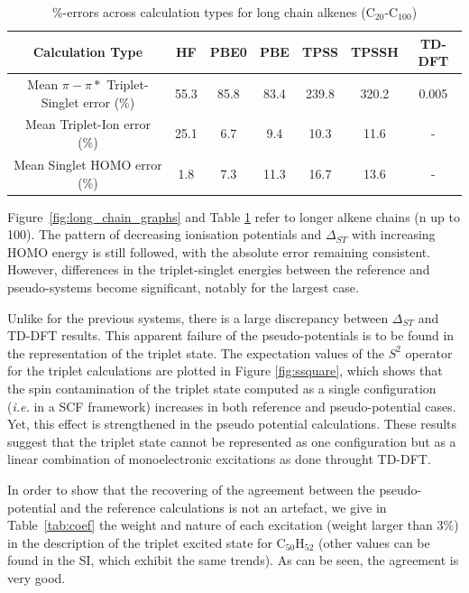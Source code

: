 \documentclass[journal=jctcce,manuscript=article]{achemso}
\begin{document}
\begin{table}[h]
\caption{\%-errors across calculation types for long chain alkenes (C\(_{20}\)-C\(_{100}\))}
\begin{tabular}{c c c c c c c}
\hline\hline
Calculation Type & HF & PBE0 & PBE & TPSS & TPSSH & TD-DFT \\
\hline
Mean \(\pi - \pi*\) Triplet-Singlet error (\%) & 55.3 & 85.8 & 83.4 & 239.8 & 320.2 & 0.005 \\
Mean Triplet-Ion error (\%) & 25.1 & 6.7 & 9.4 & 10.3 & 11.6 & - \\
Mean Singlet HOMO error (\%) & 1.8 & 7.3 & 11.3 & 16.7 & 13.6 & - \\
\hline
\end{tabular}
\label{table:long_alkene_errors}
\end{table}

Figure~\ref{fig:long_chain_graphs} and Table \ref{table:long_alkene_errors} refer to longer 
alkene chains (n up to 100).
The pattern of decreasing ionisation potentials and $\Delta_{ST}$ with increasing HOMO
energy is still followed, with the absolute error remaining consistent.
However, differences in the triplet-singlet energies between the reference and pseudo-systems 
become significant, notably for the largest case.

Unlike for the previous systems, there is a large discrepancy between $\Delta_{ST}$
and TD-DFT results.
This apparent failure of the pseudo-potentials is to be found in the representation
of the triplet state. The expectation values of the $S^2$ operator for the triplet calculations
are plotted in Figure \ref{fig:ssquare}, which shows that the spin contamination
of the triplet state computed as a single configuration (\emph{i.e.} in a SCF
framework) increases in both reference and pseudo-potential cases.
Yet, this effect is strengthened in the pseudo potential calculations.
These results suggest that the triplet state cannot be represented as one configuration
but as a linear combination of monoelectronic excitations as done throught TD-DFT.

In order to show that the recovering of the agreement between the pseudo-potential
and the reference calculations is not an artefact, we give in Table~\ref{tab:coef}
the weight and nature of each excitation (weight larger than 3\%)
in the description of the triplet excited state for
C$_{50}$H$_{52}$ (other values can be found in the SI, which exhibit the same trends).
As can be seen, the agreement is very good. 
\end{document}
